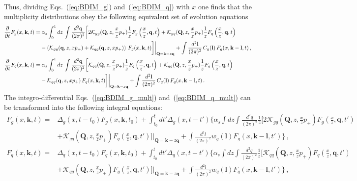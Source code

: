 \documentclass[preprint,12pt]{elsarticle}
\begin{document}
%
Thus, dividing Eqs.~(\ref{eq:BDIM_g}) and~(\ref{eq:BDIM_q}) with $x$ one finds that the multiplicity distributions obey the following equivalent set of evolution equations
\begin{align}
\frac{\partial}{\partial t} F_g(x,\mathbf{k},t) = & \:  \alpha_s \int_0^1 dz\, \int\frac{d^2\mathbf{q}}{(2\pi)^2}\bigg[2{\cal K}_{gg}(\mathbf{Q},z,\frac{x}{z}p_+) \frac{1}{z}F_g\left(\frac{x}{z},\mathbf{q},t\right) + {\cal K}_{gq}(\mathbf{Q},z,\frac{x}{z}p_+) \frac{1}{z}F_{q}\left(\frac{x}{z},\mathbf{q},t\right) \nonumber\\&
-  \left({\cal K}_{gg}(\mathbf{q},z,xp_+)+{\cal K}_{qg}(\mathbf{q},z,xp_+)\right)\, F_g(x,\mathbf{k},t) \bigg] \bigg|_{\mathbf{Q}=\mathbf{k}-z\mathbf{q} }
+ \int \frac{d^2\mathbf{l}}{(2\pi)^2} \,C_g(\mathbf{l})\, F_g(x,\mathbf{k}-\mathbf{l},t)\,,\label{eq:BDIM_g_mult}\\
%
\frac{\partial}{\partial t} F_{q}(x,\mathbf{k},t) = & \:  \alpha_s \int_0^1 dz\, \int\frac{d^2\mathbf{q}}{(2\pi)^2}\bigg[{\cal K}_{qq}(\mathbf{Q},z,\frac{x}{z}p_+) \frac{1}{z}F_{q}\left(\frac{x}{z},\mathbf{q},t\right) +  {\cal K}_{qg}(\mathbf{Q},z,\frac{x}{z}p_+) \frac{1}{z}F_g\left(\frac{x}{z},\mathbf{q},t\right) \nonumber\\&
-  {\cal K}_{qq}(\mathbf{q},z,xp_+)\, F_{q}(x,\mathbf{k},t) \bigg] \bigg|_{\mathbf{Q}=\mathbf{k}-z\mathbf{q} }
+ \int \frac{d^2\mathbf{l}}{(2\pi)^2} \,C_q(\mathbf{l})\, F_{q}(x,\mathbf{k}-\mathbf{l},t)\,.
\label{eq:BDIM_q_mult}
\end{align}
%
The integro-differential Eqs.~(\ref{eq:BDIM_g_mult}) and~(\ref{eq:BDIM_q_mult}) can be transformed  into the following integral equations:
%
\begin{align}
    F_g(x,\mathbf{k},t)=&\Delta_g(x,t-t_0)F_g(x,\mathbf{k},t_0)+\int_{t_0}^t dt' \Delta_g(x,t-t')\bigg\{ \alpha_s\int dz\int \frac{d^2 q}{(2\pi)^2} \frac{1}{z}\bigg[2\mathcal{K}_{gg}(\mathbf{Q},z,\frac{x}{z}p_+)F_g(\frac{x}{z},\mathbf{q},t')
    \nonumber\\
    &+\mathcal{K}_{gq}(\mathbf{Q},z,\frac{x}{z}p_+)F_q(\frac{x}{z},\mathbf{q},t')\bigg] \bigg|_{\mathbf{Q}=\mathbf{k}-z\mathbf{q} }+\int \frac{d^2l}{(2\pi)^2}w_g(\mathbf{l})F_g(x,\mathbf{k}-\mathbf{l},t')\bigg\}\,,
    \label{eq:bdim_int_g}
    \\
    F_q(x,\mathbf{k},t)=&\Delta_q(x,t-t_0)F_q(x,\mathbf{k},t_0)+\int_{t_0}^t dt' \Delta_q(x,t-t')\bigg\{ \alpha_s\int dz\int \frac{d^2 q}{(2\pi)^2} \frac{1}{z}\bigg[\mathcal{K}_{qq}(\mathbf{Q},z,\frac{x}{z}p_+)F_q(\frac{x}{z},\mathbf{q},t')
    \nonumber\\
    &+\mathcal{K}_{qg}(\mathbf{Q},z,\frac{x}{z}p_+)F_g(\frac{x}{z},\mathbf{q},t')\bigg] \bigg|_{\mathbf{Q}=\mathbf{k}-z\mathbf{q} }+\int \frac{d^2l}{(2\pi)^2}w_q(\mathbf{l})F_q(x,\mathbf{k}-\mathbf{l},t')\bigg\}\,,
    \label{eq:bdim_int_q}
\end{align}
\end{document}
